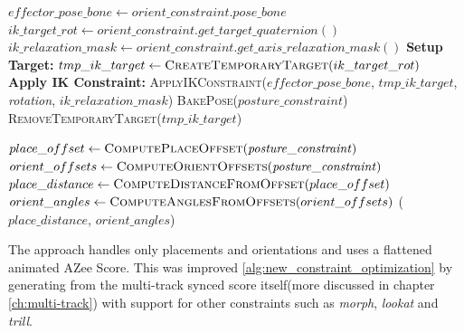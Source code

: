 \documentclass[../../main.tex]{subfiles}
\begin{document}
\begin{algorithm}
\begin{algorithmic}[1]
            \State $effector\_pose\_bone \gets \mathit{orient\_constraint.pose\_bone}$
            \State $ik\_target\_rot \gets \mathit{orient\_constraint.get\_target\_quaternion()}$
            \State $ik\_relaxation\_mask \gets \mathit{orient\_constraint.get\_axis\_relaxation\_mask()}$
            \State \textbf{Setup Target:} $tmp\_ik\_target \gets \textsc{CreateTemporaryTarget}(ik\_target\_rot)$
            \State \textbf{Apply IK Constraint:} \textsc{ApplyIKConstraint}($effector\_pose\_bone$, $tmp\_ik\_target$, \textit{rotation}, $ik\_relaxation\_mask$)
            \State \textsc{BakePose}($\mathit{posture\_constraint}$)
            \State \textsc{RemoveTemporaryTarget}($tmp\_ik\_target$)
        \EndFor
    \EndProcedure
    
        \State $place\_offset \gets \textsc{ComputePlaceOffset}(\mathit{posture\_constraint})$
        \State $orient\_offsets \gets \textsc{ComputeOrientOffsets}(\mathit{posture\_constraint})$
        \State $place\_distance \gets \textsc{ComputeDistanceFromOffset}(place\_offset)$
        \State $orient\_angles \gets \textsc{ComputeAnglesFromOffsets}(orient\_offsets)$
        \State \Return ($place\_distance$, $orient\_angles$)
    \EndProcedure
    \end{algorithmic}
\end{algorithm}

The approach handles only placements and orientations and uses a flattened animated AZee Score. This was improved \ref{alg:new_constraint_optimization} by generating from the multi-track synced score itself(more discussed in chapter \ref{ch:multi-track}) with support for other constraints such as \emph{morph}, \emph{lookat} and \emph{trill}.
\end{document}
